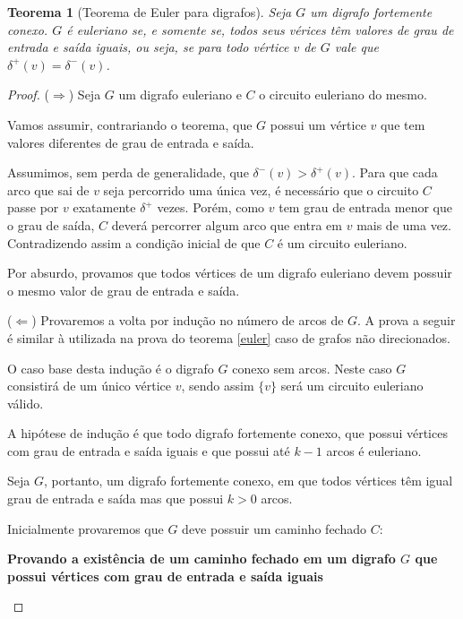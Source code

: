 \documentclass[12pt, a4paper]{article}
\newtheorem{theorem}{Teorema}[section]
\begin{document}
\begin{theorem}[Teorema de Euler para digrafos]

    Seja $G$ um digrafo fortemente conexo.
$G$ é euleriano se, e somente se, todos seus vérices têm valores de grau de entrada e saída iguais, ou seja, se para todo vértice $v$ de $G$ vale que $\delta^+(v) = \delta^-(v)$.
\label{euler-digraph}
\end{theorem}


\begin{proof}

    ($\Rightarrow$) Seja $G$ um digrafo euleriano e $C$ o circuito euleriano do mesmo. 

    Vamos assumir, contrariando o teorema, que $G$ possui um vértice $v$ que tem valores diferentes de grau de entrada e saída.

    Assumimos, sem perda de generalidade, que $\delta^-(v) > \delta^+(v)$. 
    Para que cada arco que sai de $v$ seja percorrido uma única vez, é necessário que o circuito $C$ passe por $v$ exatamente $\delta^+$ vezes. 
    Porém, como $v$ tem grau de entrada menor que o grau de saída, $C$ deverá percorrer algum arco que entra em $v$ mais de uma vez. 
    Contradizendo assim a condição inicial de que $C$ é um circuito euleriano.

    Por absurdo, provamos que todos vértices de um digrafo euleriano devem possuir o mesmo valor de grau de entrada e saída.

    ($\Leftarrow$) Provaremos a volta por indução no número de arcos de $G$. 
    A prova a seguir é similar à utilizada na prova do teorema \ref{euler} caso de grafos não direcionados.

    O caso base desta indução é o digrafo $G$ conexo sem arcos. Neste caso $G$ consistirá de um único vértice $v$, sendo assim $\{v\}$ será um circuito euleriano válido. 

    A hipótese de indução é que todo digrafo fortemente conexo, que possui vértices com grau de entrada e saída iguais e que possui até $k-1$ arcos é euleriano.

    Seja $G$, portanto, um digrafo fortemente conexo, em que todos vértices têm igual grau de entrada e saída mas que possui $k > 0$ arcos.

    Inicialmente provaremos que $G$ deve possuir um caminho fechado $C$:

    \begin{tcolorbox}
        \textbf{Provando a existência de um caminho fechado em um digrafo $G$ que possui vértices com grau de entrada e saída iguais}


\end{tcolorbox}
\end{proof}
\end{document}
